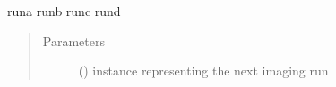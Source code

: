 \documentclass[letterpaper,10pt,english]{sphinxmanual}
\begin{document}
\begin{fulllineitems}
\begin{fulllineitems}
\begin{sphinxVerbatim}[commandchars=\\\{\}]
run\PYGZus{}a \PYGZlt{}\PYGZhy{}\PYGZgt{} run\PYGZus{}b \PYGZlt{}\PYGZhy{}\PYGZgt{} run\PYGZus{}c \PYGZlt{}\PYGZhy{}\PYGZgt{} run\PYGZus{}d
\end{sphinxVerbatim}
\begin{quote}\begin{description}
\item[{Parameters}] \leavevmode
{} ({\hyperref[\detokenize{polo.crystallography:polo.crystallography.run.HWIRun}]{}}) \textendash{} {\hyperref[\detokenize{polo.crystallography:polo.crystallography.run.HWIRun}]{}}
instance representing the next imaging run

\end{description}\end{quote}

\end{fulllineitems}


\end{fulllineitems}

\end{document}
